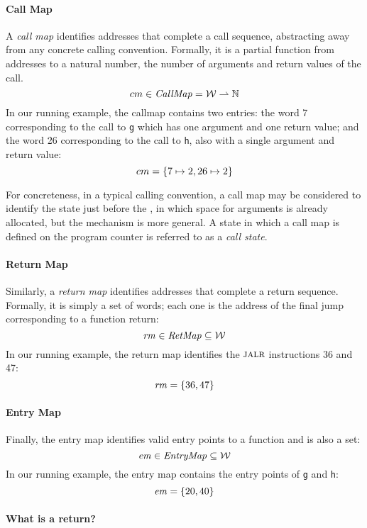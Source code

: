 \documentclass[acmsmall,review,anonymous]{acmart}\settopmatter{printfolios=true,printccs=false,printacmref=false}
\begin{document}
\paragraph*{Call Map}

A {\em call map} identifies addresses that complete a call sequence,
abstracting away from any concrete calling convention. Formally, it is
a partial function from addresses to a natural number, the number of
arguments and return values of the call.
\[cm \in \mathit{CallMap} = {\mathcal W} \rightharpoonup \mathbb{N}\]
%
In our running example, the callmap contains two entries: the word 7
corresponding to the call to {\tt g} which has one argument and one
return value; and the word 26 corresponding to the call to {\tt h},
also with a single argument and return value:
\[ cm = \{ 7 \mapsto 2, 26 \mapsto 2\}\]

For concreteness, in a typical calling convention, a call map may be
considered to identify the state just before the \jal, in which
space for arguments is already allocated, but the mechanism is more
general. A state in which a call map is defined on the program counter
is referred to as a {\it call state}.

\paragraph*{Return Map}
Similarly, a {\em return map} identifies addresses that complete a
return sequence. Formally, it is simply a set of words; each one
is the address of the final jump corresponding to a function return:
%
\[\mathit{rm} \in \mathit{RetMap} \subseteq {\mathcal W}\]
%
In our running example, the return map identifies the $\textsc{jalr}$
instructions 36 and 47:
\[ \mathit{rm} = \{36, 47\} \]

\paragraph*{Entry Map}
Finally, the entry map identifies valid entry points to a
function and is also a set:
\[\mathit{em} \in \mathit{EntryMap} \subseteq {\mathcal W}\]
%
In our running example, the entry map contains the entry
points of {\tt g} and {\tt h}:
\[ \mathit{em} = \{20, 40\} \]

\paragraph*{What is a return?}
\end{document}
